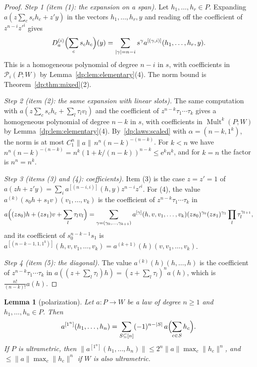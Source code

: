 \documentclass[11pt]{amsart}
\newtheorem{lemma}[theorem]{Lemma}
\theoremstyle{definition}
\theoremstyle{remark}
\numberwithin{equation}{section}
\newcommand{\Mult}{\operatorname{Mult}}
\newcommand{\abs}[1]{\lvert #1\rvert}
\newcommand{\norm}[1]{\lVert #1\rVert}
\theoremstyle{plain}
\theoremstyle{definition}
\theoremstyle{plain}
\newcommand{\cP}{\mathcal P}
\begin{document}
\begin{proof}
\emph{Step 1 (item (1): the expansion on a span).} Let $h_1,\dots,h_r\in P$. Expanding $a(z\sum_cs_ch_c+z'y)$ in the vectors $h_1,\dots,h_r,y$ and reading off the coefficient of $z^{n-i}z'^i$ gives
\begin{equation}\label{dp:laws:hasse-expansion}
 D^{(i)}_a\Bigl(\sum_cs_ch_c\Bigr)(y)=\sum_{\abs\gamma=n-i}s^\gamma a^{[(\gamma,i)]}(h_1,\dots,h_r,y).
\end{equation}
This is a homogeneous polynomial of degree $n-i$ in $s$, with coefficients in $\cP_i(P;W)$ by Lemma~\ref{dp:lem:elementary}(4). The norm bound is Theorem~\ref{dp:thm:mixed}(2).

\emph{Step 2 (item (2): the same expansion with linear slots).} The same computation with $a(z\sum_cs_ch_c+\sum_l\tau_lv_l)$ and the coefficient of $z^{n-k}\tau_1\cdots\tau_k$ gives a homogeneous polynomial of degree $n-k$ in $s$, with coefficients in $\Mult^k(P;W)$ by Lemma~\ref{dp:lem:elementary}(4). By~\eqref{dp:laws:scaled} with $\alpha=(n-k,1^k)$, the norm is at most $C_1^n\norm a\,n^n(n-k)^{-(n-k)}$. For $k<n$ we have $n^n(n-k)^{-(n-k)}=n^k(1+k/(n-k))^{n-k}\le\mathrm e^kn^k$, and for $k=n$ the factor is $n^n=n^k$.

\emph{Step 3 (items (3) and (4): coefficients).} Item (3) is the case $z=z'=1$ of $a(z h+z'y)=\sum_ia^{[(n-i,i)]}(h,y)z^{n-i}z'^i$. For (4), the value $a^{(k)}(s_0h+s_1v)(v_1,\dots,v_k)$ is the coefficient of $z^{n-k}\tau_1\cdots\tau_k$ in
\[
 a\Bigl((zs_0)h+(zs_1)v+\sum_l\tau_lv_l\Bigr)=\sum_{\gamma=(\gamma_0,\dots,\gamma_{k+1})}a^{[\gamma]}(h,v,v_1,\dots,v_k)(zs_0)^{\gamma_0}(zs_1)^{\gamma_1}\prod_l\tau_l^{\gamma_{l+1}},
\]
and its coefficient of $s_0^{n-k-1}s_1$ is $a^{[(n-k-1,1,1^k)]}(h,v,v_1,\dots,v_k)=a^{(k+1)}(h)(v,v_1,\dots,v_k)$.

\emph{Step 4 (item (5): the diagonal).} The value $a^{(k)}(h)(h,\dots,h)$ is the coefficient of $z^{n-k}\tau_1\cdots\tau_k$ in $a((z+\sum_l\tau_l)h)=(z+\sum_l\tau_l)^na(h)$, which is $\frac{n!}{(n-k)!}a(h)$.
\end{proof}

\begin{lemma}[polarization]\label{dp:lem:polarization}
Let $a\colon P\to W$ be a law of degree $n\ge1$ and $h_1,\dots,h_n\in P$. Then
\begin{equation}\label{dp:laws:polarization}
 a^{[1^n]}(h_1,\dots,h_n)=\sum_{S\subseteq[n]}(-1)^{n-\abs S}\,a\Bigl(\sum_{c\in S}h_c\Bigr).
\end{equation}
If $P$ is ultrametric, then $\norm{a^{[1^n]}(h_1,\dots,h_n)}\le2^n\norm a\max_c\norm{h_c}^n$, and $\le\norm a\max_c\norm{h_c}^n$ if $W$ is also ultrametric.
\end{lemma}
\end{document}
